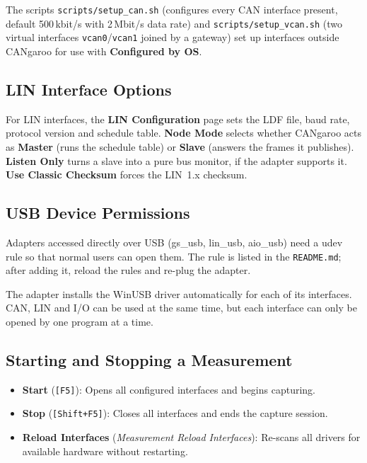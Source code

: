 \documentclass[a4paper,11pt]{article}
\newcommand{\key}[1]{\texttt{\small[#1]}}
\newcommand{\menu}[1]{\textit{#1}}
\newcommand{\ui}[1]{\textbf{#1}}
\newcommand{\file}[1]{\texttt{#1}}
\begin{document}
The scripts \file{scripts/setup\_can.sh} (configures every CAN interface present,
default 500\,kbit/s with 2\,Mbit/s data rate) and \file{scripts/setup\_vcan.sh} (two
virtual interfaces \texttt{vcan0}/\texttt{vcan1} joined by a gateway) set up
interfaces outside CANgaroo for use with \ui{Configured by OS}.

\subsection{LIN Interface Options}
\label{sec:linsetup}

For LIN interfaces, the \ui{LIN Configuration} page sets the LDF file, baud rate,
protocol version and schedule table. \ui{Node Mode} selects whether CANgaroo acts
as \ui{Master} (runs the schedule table) or \ui{Slave} (answers the frames it
publishes). \ui{Listen Only} turns a slave into a pure bus monitor, if the
adapter supports it. \ui{Use Classic Checksum} forces the LIN~1.x checksum.

\subsection{USB Device Permissions}

\begin{description}[leftmargin=2em, style=nextline]
  \item[Linux] Adapters accessed directly over USB (gs\_usb, lin\_usb, aio\_usb) need
        a udev rule so that normal users can open them. The rule is listed in the
        \file{README.md}; after adding it, reload the rules and re-plug the adapter.
  \item[Windows] The adapter installs the WinUSB driver automatically for each of its
        interfaces. CAN, LIN and I/O can be used at the same time, but each interface
        can only be opened by one program at a time.
\end{description}

\subsection{Starting and Stopping a Measurement}

\begin{itemize}
  \item \ui{Start} (\key{F5}): Opens all configured interfaces and begins capturing.
  \item \ui{Stop} (\key{Shift+F5}): Closes all interfaces and ends the capture session.
  \item \ui{Reload Interfaces} (\menu{Measurement \textrightarrow{} Reload Interfaces}):
        Re-scans all drivers for available hardware without restarting.
\end{itemize}
\end{document}
